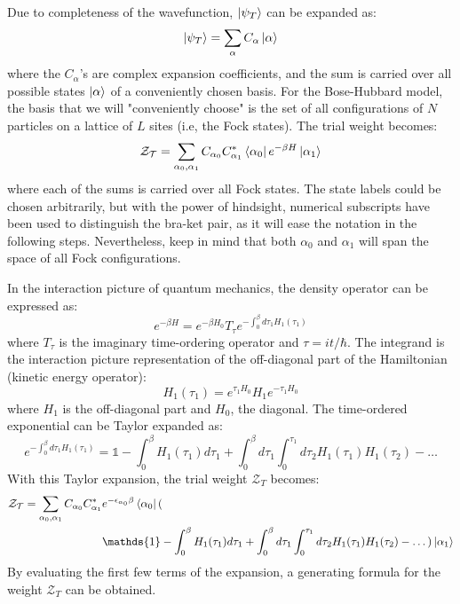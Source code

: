 \documentclass[12pt, two sided]{article}
\begin{document}
Due to completeness of the wavefunction, $\ket{\psi_T}$ can be expanded as:
%
\begin{equation}
\ket{\psi_T} = \sum_{\alpha} C_{\alpha} \ket{\alpha}
\end{equation}
%
where the $C_\alpha$'s are complex expansion coefficients, and the sum is carried over all possible states $\ket{\alpha}$ of a conveniently chosen basis. For the Bose-Hubbard model, the basis that we will "conveniently choose" is the set of all configurations of $N$ particles on a lattice of $L$ sites (i.e, the Fock states). The trial weight becomes:
%
\begin{equation}
\mathcal{Z_T} = \sum_{\alpha_0, \alpha_1} C_{\alpha_0} C_{\alpha_1}^{*} \bra{\alpha_0} e^{-\beta H} \ket{\alpha_1}
\end{equation}
%
where each of the sums is carried over all Fock states. The state labels could be chosen arbitrarily, but with the power of hindsight, numerical subscripts have been used to distinguish the bra-ket pair, as it will ease the notation in the following steps. Nevertheless, keep in mind that both $\alpha_0$ and $\alpha_1$ will span the space of all Fock configurations.

In the interaction picture of quantum mechanics, the density operator can be expressed as:
%
\begin{equation}
\label{eq:density_op_01}
e^{-\beta H} = e^{-\beta H_0} T_{\tau} e^{- \int_0^{\beta} d\tau_1 H_1(\tau_1)}
\end{equation}
where $T_{\tau}$ is the imaginary time-ordering operator and $\tau = it/\hbar$. The integrand is the interaction picture representation of the off-diagonal part of the Hamiltonian (kinetic energy operator):
%
\begin{equation}
H_1(\tau_1) = e^{\tau_1 H_0} H_1 e^{-\tau_1 H_0}
\end{equation}
%
where $H_1$ is the off-diagonal part and $H_0$, the diagonal. The time-ordered exponential can be Taylor expanded as:
\begin{equation}
e^{- \int_0^{\beta} d\tau_1 H_1(\tau_1)} = \mathds{1} - \int_{0}^{\beta} H_1(\tau_1) d\tau_1 + \int_0^{\beta} d\tau_1 \int_{0}^{\tau_1} d\tau_2 H_1(\tau_1) H_1(\tau_2) - \dots 
\end{equation}
%
With this Taylor expansion, the trial weight $\mathcal{Z}_T$ becomes:
%
\begin{equation}
\begin{aligned}
\mathcal{Z_T} = \sum_{\alpha_0, \alpha_1} C_{\alpha_0} C_{\alpha_1}^{*} &e^{-\epsilon_{\alpha_0} \beta}  \bra{\alpha_0} ( \\
& \mathds{1} - \int_{0}^{\beta} H_1(\tau_1) d\tau_1 + \int_0^{\beta} d\tau_1 \int_{0}^{\tau_1} d\tau_2 H_1(\tau_1) H_1(\tau_2) - \dots ) \ket{\alpha_1}
\end{aligned}
\end{equation}
%
By evaluating the first few terms of the expansion, a generating formula for the weight $\mathcal{Z}_T$ can be obtained. 
\end{document}
